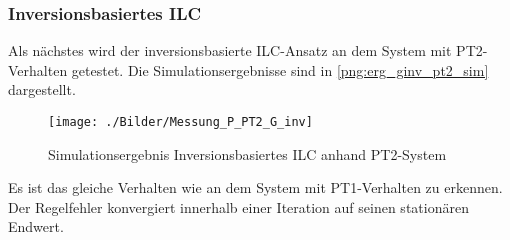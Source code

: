 \subsubsection{Inversionsbasiertes ILC}
Als nächstes wird der inversionsbasierte ILC-Ansatz an dem System mit PT2-Verhalten getestet. Die Simulationsergebnisse sind in \autoref{png:erg_ginv_pt2_sim} dargestellt.
\begin{figure}[ht]
	\centering
	\texttt{[image: ./Bilder/Messung\_P\_PT2\_G\_inv]}
	\caption{Simulationsergebnis Inversionsbasiertes ILC anhand PT2-System}
	\label{png:erg_ginv_pt2_sim}
\end{figure}
Es ist das gleiche Verhalten wie an dem System mit PT1-Verhalten zu erkennen. Der Regelfehler konvergiert innerhalb einer Iteration auf seinen stationären Endwert.

